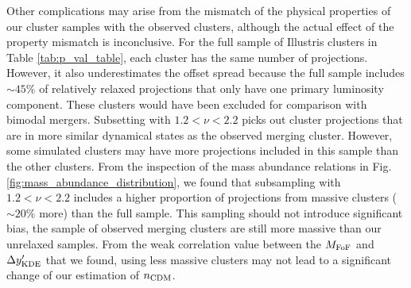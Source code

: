 
Other complications may arise from the mismatch of the physical properties of 
our cluster samples with the observed clusters, although the actual effect of the
property mismatch is inconclusive. 
For the full sample of Illustris clusters in Table \ref{tab:p_val_table}, 
each cluster has the same number of projections. 
However, it also underestimates the offset spread because the
full sample includes $\sim 45\%$ of relatively relaxed projections 
that only have one primary luminosity component.  These clusters would
have been excluded for comparison with bimodal mergers. 
Subsetting with $1.2 < \nu < 2.2$ picks out
cluster projections that are in more similar dynamical states as the observed merging
cluster. 
However, some simulated clusters may have more projections included in this sample
than the other clusters. From the inspection of the mass abundance relations in 
Fig. \ref{fig:mass_abundance_distribution}, we found that subsampling with $1.2 <
\nu <2.2$ includes a higher proportion of projections from massive clusters
($\sim 20\%$ more) than 
the full sample. 
This sampling should not introduce significant bias, 
the sample of observed merging clusters are still more massive than our
unrelaxed samples. From the weak correlation value between the $M_{\rm FoF}$ and
$\Delta y_{\rm KDE}'$ that we found, using less massive clusters may not lead to a significant
change of our estimation of $n_{\rm CDM}$.  

